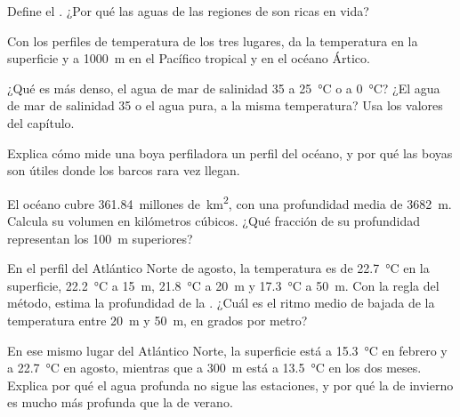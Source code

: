 \begin{exercise}[$\star$]\label{exo:g10:layered-ocean:2}
Define el . ¿Por qué las aguas de las regiones de 
son ricas en vida?
\end{exercise}

\begin{exercise}[$\star$]\label{exo:g10:layered-ocean:3}
Con los perfiles de temperatura de los tres lugares, da la temperatura en la
superficie y a \qty{1000}{m} en el Pacífico tropical y en el océano Ártico.
\end{exercise}

\begin{exercise}[$\star$]\label{exo:g10:layered-ocean:4}
¿Qué es más denso, el agua de mar de salinidad 35 a \qty{25}{\degreeCelsius}
o a \qty{0}{\degreeCelsius}? ¿El agua de mar de salinidad 35 o el agua pura, a
la misma temperatura? Usa los valores del capítulo.
\end{exercise}

\begin{exercise}[$\star$]\label{exo:g10:layered-ocean:5}
Explica cómo mide una boya perfiladora un perfil del océano, y por qué las
boyas son útiles donde los barcos rara vez llegan.
\end{exercise}

\begin{exercise}[$\star\star$]\label{exo:g10:layered-ocean:6}
El océano cubre \num{361.84}~millones de~\unit{km^2}, con una profundidad
media de \qty{3682}{m}. Calcula su volumen en kilómetros cúbicos. ¿Qué
fracción de su profundidad representan los \qty{100}{m} superiores?
\end{exercise}

\begin{exercise}[$\star\star$]\label{exo:g10:layered-ocean:7}
En el perfil del Atlántico Norte de agosto, la temperatura es de
\qty{22.7}{\degreeCelsius} en la superficie, \qty{22.2}{\degreeCelsius} a
\qty{15}{m}, \qty{21.8}{\degreeCelsius} a \qty{20}{m} y
\qty{17.3}{\degreeCelsius} a \qty{50}{m}. Con la regla del método, estima la
profundidad de la . ¿Cuál es el ritmo medio de bajada de la
temperatura entre \qty{20}{m} y \qty{50}{m}, en grados por metro?
\end{exercise}

\begin{exercise}[$\star\star$]\label{exo:g10:layered-ocean:8}
En ese mismo lugar del Atlántico Norte, la superficie está a
\qty{15.3}{\degreeCelsius} en febrero y a \qty{22.7}{\degreeCelsius} en
agosto, mientras que a \qty{300}{m} está a \qty{13.5}{\degreeCelsius} en los
dos meses. Explica por qué el agua profunda no sigue las estaciones, y por qué
la  de invierno es mucho más profunda que la de verano.
\end{exercise}

